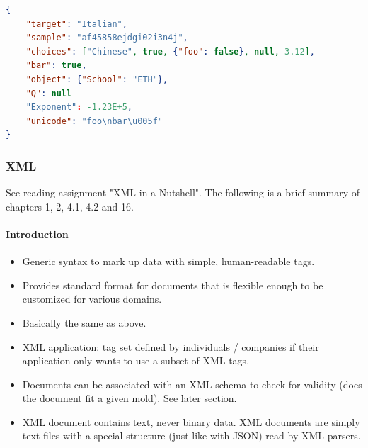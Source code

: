 \begin{lstlisting}[language=json,firstnumber=1]
{
    "target": "Italian",
    "sample": "af45858ejdgi02i3n4j",
    "choices": ["Chinese", true, {"foo": false}, null, 3.12],
    "bar": true,
    "object": {"School": "ETH"},
    "Q": null
    "Exponent": -1.23E+5,
    "unicode": "foo\nbar\u005f"
}
\end{lstlisting}



\subsubsection{XML}

See reading assignment "XML in a Nutshell". The following is a brief summary of chapters 1, 2, 4.1, 4.2 and 16.

\paragraph{Introduction}
\begin{itemize}
    \item Generic syntax to mark up data with simple, human-readable tags.
    \item Provides standard format for documents that is flexible enough to be customized for various domains.
    \item Basically the same as above.
    \item XML application: tag set defined by individuals / companies if their application only wants to use a subset of XML tags.
    \item Documents can be associated with an XML schema to check for validity (does the document fit a given mold). See later section.
    \item XML document contains text, never binary data. XML documents are simply text files with a special structure (just like with JSON) read by XML parsers.
\end{itemize}

